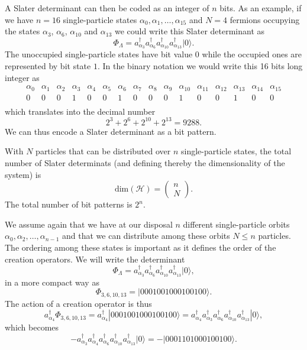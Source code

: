 A Slater  determinant can then be coded as an integer of $n$ bits. As an example, if we have $n=16$ single-particle states
$\alpha_0,\alpha_1,\dots,\alpha_{15}$ and $N=4$ fermions occupying the states $\alpha_3$, $\alpha_6$, $\alpha_{10}$ and $\alpha_{13}$
we could write this Slater determinant as  
\[
\Phi_{\Lambda} = a_{\alpha_3}^{\dagger} a_{\alpha_6}^{\dagger} a_{\alpha_{10}}^{\dagger} a_{\alpha_{13}}^{\dagger} |0\rangle.
\]
The unoccupied single-particle states have bit value $0$ while the occupied ones are represented by bit state $1$. 
In the binary notation we would write this   16 bits long integer as
\[
\begin{array}{cccccccccccccccc}
{\alpha_0}&{\alpha_1}&{\alpha_2}&{\alpha_3}&{\alpha_4}&{\alpha_5}&{\alpha_6}&{\alpha_7} & {\alpha_8} &{\alpha_9} & {\alpha_{10}} &{\alpha_{11}} &{\alpha_{12}} &{\alpha_{13}} &{\alpha_{14}} & {\alpha_{15}} \\
{0} & {0} &{0} &{1} &{0} &{0} &{1} &{0} &{0} &{0} &{1} &{0} &{0} &{1} &{0} & {0} \\
\end{array}
\]
which translates into the decimal number
\[
2^3+2^6+2^{10}+2^{13}=9288.
\]
We can thus encode a Slater determinant as a bit pattern.

With $N$ particles that can be distributed over $n$ single-particle states, the total number of Slater determinats (and defining thereby the dimensionality of the system) is
\[
\mathrm{dim}(\mathcal{H}) = \left(\begin{array}{c} n \\N\end{array}\right).
\]
The total number of bit patterns is $2^n$. 

We assume again that we have at our disposal $n$ different single-particle orbits
$\alpha_0,\alpha_2,\dots,\alpha_{n-1}$ and that we can distribute  among these orbits $N\le n$ particles.
The ordering among these states is important as it defines the order of the creation operators.
We will write the determinant 
\[
\Phi_{\Lambda} = a_{\alpha_3}^{\dagger} a_{\alpha_6}^{\dagger} a_{\alpha_{10}}^{\dagger} a_{\alpha_{13}}^{\dagger} |0\rangle,
\]
in a more compact way as 
\[
\Phi_{3,6,10,13} = |0001001000100100\rangle.
\]
The action of a creation operator is thus
\[
a^{\dagger}_{\alpha_4}\Phi_{3,6,10,13} = a^{\dagger}_{\alpha_4}|0001001000100100\rangle=a^{\dagger}_{\alpha_4}a_{\alpha_3}^{\dagger} a_{\alpha_6}^{\dagger} a_{\alpha_{10}}^{\dagger} a_{\alpha_{13}}^{\dagger} |0\rangle,
\]
which becomes
\[
-a_{\alpha_3}^{\dagger} a^{\dagger}_{\alpha_4} a_{\alpha_6}^{\dagger} a_{\alpha_{10}}^{\dagger} a_{\alpha_{13}}^{\dagger} |0\rangle=-|0001101000100100\rangle.
\]

